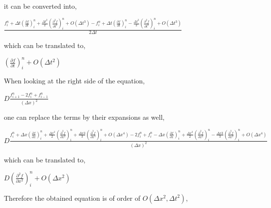 \documentclass[12pt]{article}
\begin{document}
\par it can be converted into,

\begin{center}
\Large
$
\frac{f_i^{n} + \Delta t \left( \frac{\partial f}{\partial t} \right)_i^n + \frac{\Delta t ^2}{2} \left( \frac{\partial ^2 f}{\partial t ^2} \right)_i^n + O(\Delta t ^3) - f_i^{n} + \Delta t \left( \frac{\partial f}{\partial t} \right)_i^n - \frac{\Delta t ^2}{2} \left( \frac{\partial ^2 f}{\partial t ^2} \right)_i^n + O(\Delta t ^3)}{2 \Delta t}
$
\end{center}

\par which can be translated to,

\begin{center}
\Large
$
\left( \frac{\partial f}{\partial t} \right)_i^n + O(\Delta t ^2)
$
\end{center}

\par When looking at the right side of the equation,

\begin{center}
\Large
$
D \frac{f_{i + 1}^{n} - 2f_{i}^{n} + f_{i - 1}^{n}}{(\Delta x)^2}
$
\end{center}

\par one can replace the terms by their expansions as well,

\begin{center}
$
D \frac{f_i^{n} + \Delta x \left( \frac{\partial f}{\partial x} \right)_i^n + \frac{\Delta x ^2}{2} \left( \frac{\partial ^2 f}{\partial x ^2} \right)_i^n + \frac{\Delta x 3}{3} \left( \frac{\partial ^3 f}{\partial x ^3} \right)_i^n + O(\Delta x ^4) - 2f_{i}^{n} + f_i^{n} - \Delta x \left( \frac{\partial f}{\partial x} \right)_i^n + \frac{\Delta x ^2}{2} \left( \frac{\partial ^2 f}{\partial x ^2} \right)_i^n - \frac{\Delta x 3}{3} \left( \frac{\partial ^3 f}{\partial x ^3} \right)_i^n + O(\Delta x ^4)}{(\Delta x)^2}
$
\end{center}

\par which can be translated to,

\begin{center}
\Large
$
D \left( \frac{\partial ^2 f}{\partial x ^2} \right)_i^n + O(\Delta x ^2)
$
\end{center}

\par Therefore the obtained equation is of order of $O(\Delta x ^2, \Delta t ^2)$,
\end{document}
